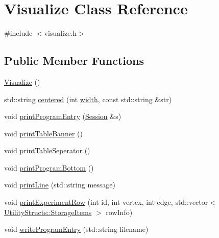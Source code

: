 \hypertarget{class_visualize}{}\section{Visualize Class Reference}
\label{class_visualize}


{\ttfamily \#include $<$visualize.\+h$>$}

\subsection*{Public Member Functions}
\begin{DoxyCompactItemize}
\item 
\hyperlink{class_visualize_a8d4163ad53518ec0c8a3eaec2bf2fe7b_a8d4163ad53518ec0c8a3eaec2bf2fe7b}{Visualize} ()
\item 
std\+::string \hyperlink{class_visualize_a9d34d81d684587b8b2b8bf70031f1670_a9d34d81d684587b8b2b8bf70031f1670}{centered} (int \hyperlink{class_visualize_af5ac723ad5f8fe8c4a8378bf1299cda7_af5ac723ad5f8fe8c4a8378bf1299cda7}{width}, const std\+::string \&str)
\item 
void \hyperlink{class_visualize_a29f27ff8c5e59163eea2be42ff372405_a29f27ff8c5e59163eea2be42ff372405}{print\+Program\+Entry} (\hyperlink{struct_session}{Session} \&s)
\item 
void \hyperlink{class_visualize_a3e1aa31f14abdf3cf53662cddc536c6a_a3e1aa31f14abdf3cf53662cddc536c6a}{print\+Table\+Banner} ()
\item 
void \hyperlink{class_visualize_a2d38641cb335d7bbf7e11567b07e2d85_a2d38641cb335d7bbf7e11567b07e2d85}{print\+Table\+Seperator} ()
\item 
void \hyperlink{class_visualize_ac0be9ece2d80a7d1e34724fb87424216_ac0be9ece2d80a7d1e34724fb87424216}{print\+Program\+Bottom} ()
\item 
void \hyperlink{class_visualize_abce6cd538dc0715b21851e0bf0377d85_abce6cd538dc0715b21851e0bf0377d85}{print\+Line} (std\+::string message)
\item 
void \hyperlink{class_visualize_a52a0dfaf625bd3ac294a00e3161094cf_a52a0dfaf625bd3ac294a00e3161094cf}{print\+Experiment\+Row} (int id, int vertex, int edge, std\+::vector$<$ \hyperlink{struct_utility_structs_1_1_storage_items}{Utility\+Structs\+::\+Storage\+Items} $>$ row\+Info)
\item 
void \hyperlink{class_visualize_a6e27b451c2662681cb3119e9ff1c22da_a6e27b451c2662681cb3119e9ff1c22da}{write\+Program\+Entry} (std\+::string filename)
\item 

\end{DoxyCompactItemize}
